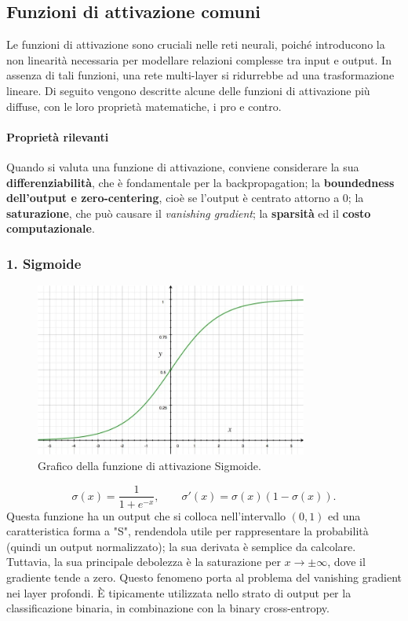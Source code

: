 \documentclass[a4paper,12pt]{report}
\begin{document}
	\subsection{Funzioni di attivazione comuni}
	Le funzioni di attivazione sono cruciali nelle reti neurali, poiché introducono la non linearità necessaria per modellare relazioni complesse tra input e output. In assenza di tali funzioni, una rete multi-layer si ridurrebbe ad una trasformazione lineare. Di seguito vengono descritte alcune delle funzioni di attivazione più diffuse, con le loro proprietà matematiche, i pro e contro.
	
	\paragraph{Proprietà rilevanti}
	Quando si valuta una funzione di attivazione, conviene considerare la sua \textbf{differenziabilità}, che è fondamentale per la backpropagation; la \textbf{boundedness dell'output e zero-centering}, cioè se l'output è centrato attorno a 0; la \textbf{saturazione}, che può causare il \textit{vanishing gradient}; la \textbf{sparsità} ed il \textbf{costo computazionale}.
	
	\subsubsection{1. Sigmoide}
	\begin{figure}[H]
		\centering
		\includegraphics[width=0.8\textwidth]{img/sigmoid.png}
		\caption{Grafico della funzione di attivazione Sigmoide.}
	\end{figure}
	\[
	\sigma(x) = \frac{1}{1+e^{-x}},\qquad
	\sigma'(x)=\sigma(x)(1-\sigma(x)).
	\]
	Questa funzione ha un output che si colloca nell'intervallo $(0,1)$ ed una caratteristica forma a "S", rendendola utile per rappresentare la probabilità (quindi un output normalizzato); la sua derivata è semplice da calcolare. Tuttavia, la sua principale debolezza è la saturazione per $x\to\pm\infty$, dove il gradiente tende a zero. Questo fenomeno porta al problema del vanishing gradient nei layer profondi. È tipicamente utilizzata nello strato di output per la classificazione binaria, in combinazione con la binary cross-entropy.
	
\end{document}
